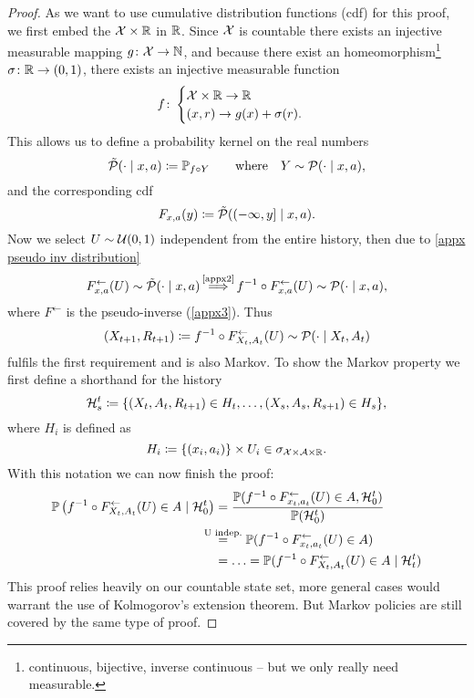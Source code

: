 \begin{proof}
	As we want to use cumulative distribution functions (cdf) for this proof, we first embed the \(\mathcal{X}\times\mathbb{R}\) in \(\mathbb{R}\). Since \(\mathcal{X}\) is countable there exists an injective measurable mapping \(g\colon \mathcal{X}\to\mathbb{N}\),
	and because there exist an homeomorphism\footnote{continuous, bijective, inverse continuous -- but we only really need measurable.} \(\sigma\colon \mathbb{R}\to(0,1)\), there exists an injective measurable function
	\begin{align*}
		f\colon
		\begin{cases}
			\mathcal{X}\times\mathbb{R} \to \mathbb{R} \\
			(x,r)\to g(x)+\sigma(r).
		\end{cases}
	\end{align*}
	This allows us to define a probability kernel on the real numbers
	\[
		\tilde{\mathcal{P}}(\cdot\mid x,a)\coloneqq \mathbb{P}_{f\circ Y} \qquad 
		\text{where}\quad Y\sim \mathcal{P}(\cdot\mid x,a),
	\] and the corresponding cdf
	\[
		F_{x,a}(y)\coloneqq \tilde{\mathcal{P}}( (-\infty,y]\mid x,a).
	\]
	Now we select \(U\sim \mathcal{U}(0,1)\) independent from the entire history, then due to \ref{appx pseudo inv distribution}
	\begin{align*}
		F^\leftarrow_{x,a}(U) \sim \tilde{\cP}(\cdot\mid x,a) 
		\ximplies{\text{\ref{appx2}}} f^{-1}\circ F^\leftarrow_{x,a}(U)\sim \cP(\cdot \mid x,a),
	\end{align*}
	where \(F^\leftarrow\) is the pseudo-inverse (\ref{appx3}).	Thus 
	\[
		(X_{t+1},R_{t+1})\coloneqq f^{-1}\circ 
		F^\leftarrow_{X_t, A_t}(U) \sim \mathcal{P}(\cdot \mid X_t, A_t)
	\]
	fulfils the first requirement and is also Markov. To show the Markov property we first define a shorthand for the history
	\[
		\mathcal{H}_s^t\coloneqq \{(X_t,A_t,R_{t+1})\in H_t,\dots,(X_s,A_s,R_{s+1})\in H_s \},
	\]
	where \(H_i\) is defined as
	\[
		H_i\coloneqq\{(x_i,a_i)\}\times U_i \in \sigma_{\mathcal{X}\times\mathcal{A}\times\mathbb{R}}.
	\]
	With this notation we can now finish the proof:
	\begin{align*}
		\Pr\left(f^{-1}\circ F^\leftarrow_{X_t, A_t}(U) \in A \mid \cH_0^t\right)
		&=\frac{\Pr(f^{-1}\circ F^\leftarrow_{x_t, a_t}(U) \in A, \cH_0^t)}{
			\Pr(\cH_0^t)}\\
		&\lxeq{\text{U indep.}}\Pr(f^{-1}\circ F^\leftarrow_{x_t, a_t}(U) \in A)\\
		&=\dotsc = \Pr(f^{-1}\circ F^\leftarrow_{X_t, A_t}(U) \in A \mid \cH_t^t)
	\end{align*}
	This proof relies heavily on our countable state set, more general cases would warrant the use of Kolmogorov's extension theorem. But Markov policies are still covered by the same type of proof.
\end{proof}

